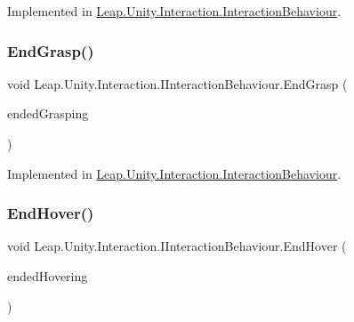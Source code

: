 Implemented in \mbox{\hyperlink{class_leap_1_1_unity_1_1_interaction_1_1_interaction_behaviour_ac75f580c1e1e3136fab5f7cc5764c84d}{Leap.\+Unity.\+Interaction.\+Interaction\+Behaviour}}.

\mbox{\label{interface_leap_1_1_unity_1_1_interaction_1_1_i_interaction_behaviour_a337f8e0a31f507a3fcd2bdcf1abb9df1}} 
\subsubsection{\texorpdfstring{EndGrasp()}{EndGrasp()}}
{\footnotesize\ttfamily void Leap.\+Unity.\+Interaction.\+I\+Interaction\+Behaviour.\+End\+Grasp (\begin{DoxyParamCaption}\item[{List$<$ \mbox{\hyperlink{class_leap_1_1_unity_1_1_interaction_1_1_interaction_controller}{Interaction\+Controller}} $>$}]{ended\+Grasping }\end{DoxyParamCaption})}



Implemented in \mbox{\hyperlink{class_leap_1_1_unity_1_1_interaction_1_1_interaction_behaviour_a64b36a1d5314d1befc47447f8a3e46f9}{Leap.\+Unity.\+Interaction.\+Interaction\+Behaviour}}.

\mbox{\label{interface_leap_1_1_unity_1_1_interaction_1_1_i_interaction_behaviour_aba5485bd77f8d0a4d1af803a506f7c11}} 
\subsubsection{\texorpdfstring{EndHover()}{EndHover()}}
{\footnotesize\ttfamily void Leap.\+Unity.\+Interaction.\+I\+Interaction\+Behaviour.\+End\+Hover (\begin{DoxyParamCaption}\item[{List$<$ \mbox{\hyperlink{class_leap_1_1_unity_1_1_interaction_1_1_interaction_controller}{Interaction\+Controller}} $>$}]{ended\+Hovering }\end{DoxyParamCaption})}



